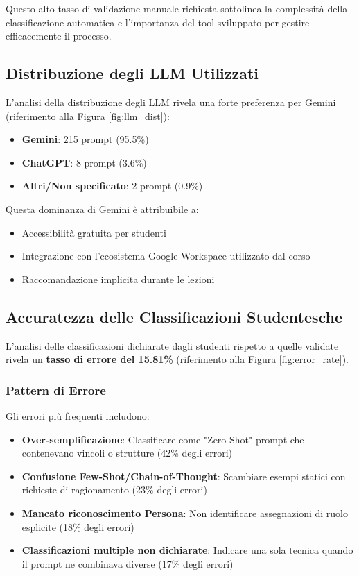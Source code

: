\documentclass[a4paper,12pt]{article}
\begin{document}
Questo alto tasso di validazione manuale richiesta sottolinea la complessità della classificazione automatica e l'importanza del tool sviluppato per gestire efficacemente il processo.

\subsection{Distribuzione degli LLM Utilizzati}
L'analisi della distribuzione degli LLM rivela una forte preferenza per Gemini (riferimento alla Figura \ref{fig:llm_dist}):

\begin{itemize}
    \item \textbf{Gemini}: 215 prompt (95.5\%)
    \item \textbf{ChatGPT}: 8 prompt (3.6\%)
    \item \textbf{Altri/Non specificato}: 2 prompt (0.9\%)
\end{itemize}

Questa dominanza di Gemini è attribuibile a:
\begin{itemize}
    \item Accessibilità gratuita per studenti
    \item Integrazione con l'ecosistema Google Workspace utilizzato dal corso
    \item Raccomandazione implicita durante le lezioni
\end{itemize}

\subsection{Accuratezza delle Classificazioni Studentesche}
L'analisi delle classificazioni dichiarate dagli studenti rispetto a quelle validate rivela un \textbf{tasso di errore del 15.81\%} (riferimento alla Figura \ref{fig:error_rate}). 

\subsubsection{Pattern di Errore}
Gli errori più frequenti includono:
\begin{itemize}
    \item \textbf{Over-semplificazione}: Classificare come "Zero-Shot" prompt che contenevano vincoli o strutture (42\% degli errori)
    \item \textbf{Confusione Few-Shot/Chain-of-Thought}: Scambiare esempi statici con richieste di ragionamento (23\% degli errori)
    \item \textbf{Mancato riconoscimento Persona}: Non identificare assegnazioni di ruolo esplicite (18\% degli errori)
    \item \textbf{Classificazioni multiple non dichiarate}: Indicare una sola tecnica quando il prompt ne combinava diverse (17\% degli errori)
\end{itemize}
\end{document}
